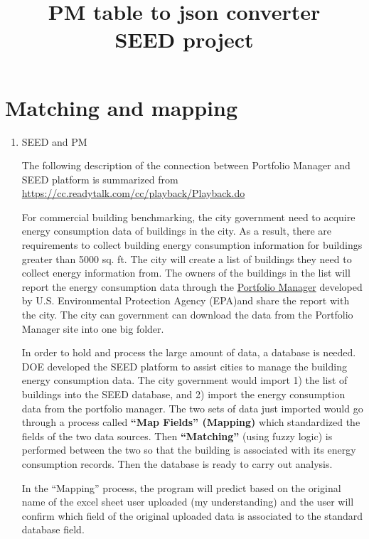 \documentclass[12pt]{article}
\begin{document}
\title{PM table to json converter\\
       \large SEED project}
\maketitle
\tableofcontents
\newpage
\section{Matching and mapping}\label{sec:map}
\begin{enumerate}
\item SEED and PM

  The following description of the connection between Portfolio
  Manager and SEED platform is summarized from
  \url{https://cc.readytalk.com/cc/playback/Playback.do} 

  For commercial building benchmarking, the city government need to
  acquire energy consumption data of buildings in the city. As a
  result, there are requirements to collect building energy
  consumption information for buildings greater than 5000 sq. ft. The
  city will create a list of buildings they need to collect energy
  information from. The owners of the buildings in the list will
  report the energy consumption data through the
  \href{https://portfoliomanager.energystar.gov/pm/home.html}{Portfolio
    Manager} developed by U.S. Environmental Protection Agency
  (EPA)and share the report with the city. The city can government can
  download the data from the Portfolio Manager site into one big
  folder. 

  In order to hold and process the large amount of data, a database is
  needed. DOE developed the SEED platform to assist cities to manage
  the building energy consumption data. The city government would
  import 1) the list of buildings into the SEED database, and 2)
  import the energy consumption data from the portfolio manager. The
  two sets of data just imported would go through a process called
  \textbf{``Map Fields'' (Mapping)} which standardized the fields of
  the two data sources. Then \textbf{``Matching''} (using fuzzy logic)
  is performed between the two so that the building is associated with
  its energy consumption records. Then the database is ready to carry
  out analysis.
  
  In the ``Mapping'' process, the program will predict based on the
  original name of the excel sheet user uploaded (my understanding)
  and the user will confirm which field of the original uploaded data
  is associated to the standard database field.
  

\end{enumerate}
\end{document}

